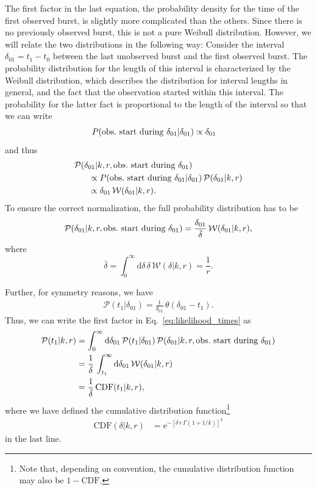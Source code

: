 \documentclass[fleqn,usenatbib]{mnras}
\newcommand{\new}[1]{#1}
\renewcommand{\d}{\delta}
\begin{document}
The first factor in the last equation, the probability density for the time of the first observed burst, is slightly more complicated than the others. Since there is no previously observed burst, this is not a pure Weibull distribution. However, we will relate the two distributions in the following way: Consider the interval $\d_{01} = t_1 - t_0$ between the last unobserved burst and the first observed burst. The probability distribution for the length of this interval is characterized by the Weibull distribution, which describes the distribution for interval lengths in general, and the fact that the observation started within this interval. The probability for the latter fact is proportional to the length of the interval so that we can write
\begin{align}
	P(\textnormal{obs.\ start during }\d_{01} | \d_{01}) &\propto \d_{01}
\end{align}
and thus
\begin{align}
	&\mathcal{P}(\d_{01}|k,r,\textnormal{obs.\ start during }\d_{01})\nonumber\\
	&~~~~~\propto P(\textnormal{obs.\ start during }\d_{01}|\d_{01}) \, \mathcal{P}(\d_{01}|k,r)\nonumber\\
	&~~~~~\propto \d_{01} \, \mathcal{W}(\d_{01}|k,r).
\end{align}
To ensure the correct normalization, the full probability distribution has to be
\begin{align}
	\mathcal{P}(\d_{01}|k,r,\textnormal{obs.\ start during }\d_{01}) = \frac{\d_{01}}{\bar{\d}} \, \mathcal{W}(\d_{01}|k,r),
\end{align}
where
\begin{equation}
	\label{eq:dbar_weibull}
	\bar{\d} = \int_0^\infty \mathrm{d}\d \, \d \, \mathcal{W}(\d|k,r) = \frac{1}{r}.
\end{equation}

Further, for symmetry reasons, we have
\begin{align}
 \mathcal{P}(t_1|\d_{01}) = \frac{1}{\d_{01}} \, \theta(\d_{01} - t_1).
\end{align}
Thus, we can write the first factor in Eq.~\eqref{eq:likelihood_times} as
\begin{align}
	\mathcal{P}(t_1|k,r) &= \int_0^\infty \mathrm{d}\d_{01} \, \mathcal{P}(t_1|\d_{01}) \, \mathcal{P}(\d_{01}|k,r,\textnormal{obs.\ start during }\d_{01})\nonumber\\
	&= \frac{1}{\bar{\d}} \, \int_{t_1}^\infty \mathrm{d}\d_{01} \, \mathcal{W}(\d_{01}|k,r)\nonumber\\
	&= \frac{1}{\bar{\d}} \, \mathrm{CDF}(t_1|k,r),
\end{align}
where we have defined the cumulative distribution function\footnote{\new{Note that, depending on convention, the cumulative distribution function may also be $1 - \mathrm{CDF}$.}}
\begin{align}
	\label{eq:cdf_weibull}
	\mathrm{CDF}(\d|k,r) &= \mathrm{e}^{-\left[\d\,r\,\Gamma(1 + 1/k)\right]^k}
\end{align}
in the last line.
\end{document}
